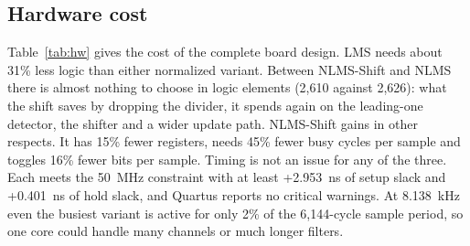 \subsection{Hardware cost}
\begin{table}[!htbp]\centering\small
\caption{Complete board design (core, codec interface, synchronizers, status logic) on Cyclone IV E
EP4CE115F29C7, $W=12$, $L=32$, Quartus Prime Lite 25.1.}\label{tab:hw}
\end{table}
Table~\ref{tab:hw} gives the cost of the complete board design. LMS needs about 31\% less logic than
either normalized variant. Between NLMS-Shift and NLMS there is almost nothing to choose in logic elements
(2,610 against 2,626): what the shift saves by dropping the divider, it spends again on the leading-one
detector, the shifter and a wider update path. NLMS-Shift gains in other respects. It has 15\% fewer
registers, needs 45\% fewer busy cycles per sample and toggles 16\% fewer bits per sample. Timing is not
an issue for any of the three. Each meets the 50~MHz constraint with at least +2.953~ns of setup slack and
+0.401~ns of hold slack, and Quartus reports no critical warnings. At 8.138~kHz even the busiest variant
is active for only 2\% of the 6,144-cycle sample period, so one core could handle many channels or much
longer filters.

